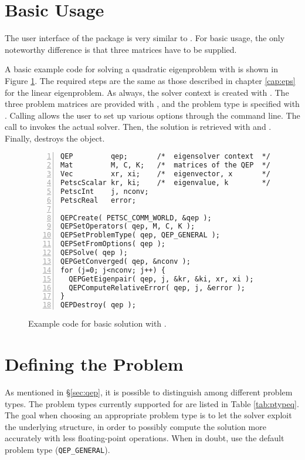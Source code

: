 \section{Basic Usage}

The user interface of the  package is very similar to . For basic usage, the only noteworthy difference is that three matrices have to be supplied.

A basic example code for solving a quadratic eigenproblem with  is shown in Figure \ref{fig:ex-qep}. The required steps are the same as those described in chapter \ref{cap:eps} for the linear eigenproblem. As always, the solver context is created with . The three problem matrices are provided with , and the problem type is specified with . Calling  allows the user to set up various options through the command line. The call to  invokes the actual solver. Then, the solution is retrieved with  and . Finally,  destroys the object.

\begin{figure}
\begin{Verbatim}[fontsize=\small,numbers=left,numbersep=6pt,xleftmargin=15mm]
QEP         qep;       /*  eigensolver context  */
Mat         M, C, K;   /*  matrices of the QEP  */
Vec         xr, xi;    /*  eigenvector, x       */
PetscScalar kr, ki;    /*  eigenvalue, k        */
PetscInt    j, nconv;
PetscReal   error;

QEPCreate( PETSC_COMM_WORLD, &qep );
QEPSetOperators( qep, M, C, K );
QEPSetProblemType( qep, QEP_GENERAL );
QEPSetFromOptions( qep );
QEPSolve( qep );
QEPGetConverged( qep, &nconv );
for (j=0; j<nconv; j++) {
  QEPGetEigenpair( qep, j, &kr, &ki, xr, xi );
  QEPComputeRelativeError( qep, j, &error );
}
QEPDestroy( qep );
\end{Verbatim}
\caption{\label{fig:ex-qep}Example code for basic solution with .}
\end{figure}


\section{Defining the Problem}

As mentioned in \S\ref{sec:qep}, it is possible to distinguish among different problem types. The problem types currently supported for  are listed in Table \ref{tab:ptypeq}. The goal when choosing an appropriate problem type is to let the solver exploit the underlying structure, in order to possibly compute the solution more accurately with less floating-point operations. When in doubt, use the default problem type (\texttt{QEP\_GENERAL}). 

